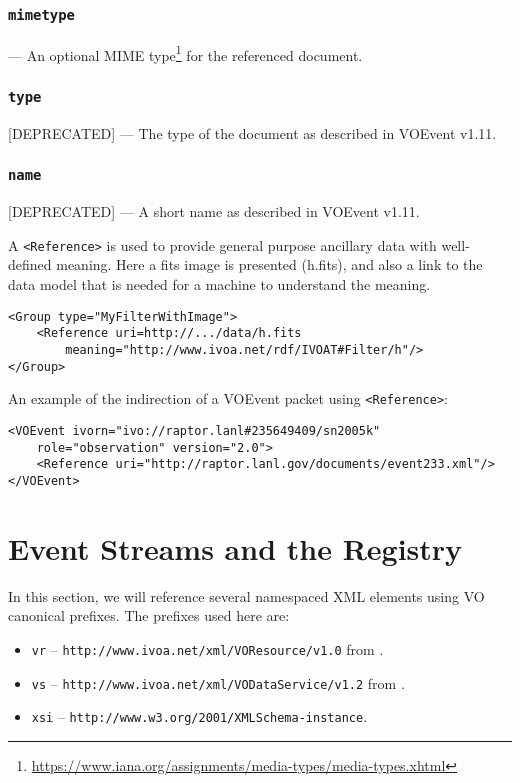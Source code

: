\documentclass[11pt,a4paper]{ivoa}
\begin{document}
\subsubsection{\tt mimetype}\label{sec:3.9.3}--- An optional MIME type\footnote{
\url{https://www.iana.org/assignments/media-types/media-types.xhtml}} for the
referenced document.
\subsubsection{\tt type}\label{sec:3.9.4}[DEPRECATED] --- The type of the
document as described in VOEvent v1.11.
\subsubsection{\tt name}\label{sec:3.9.5}[DEPRECATED] --- A short name as
described in VOEvent v1.11.

A {\tt <Reference>} is used to provide general purpose ancillary data with
well-defined meaning. Here a fits image is presented (h.fits), and also a link
to the data model that is needed for a machine to understand the meaning.
\begin{lstlisting}
<Group type="MyFilterWithImage">
    <Reference uri=http://.../data/h.fits
        meaning="http://www.ivoa.net/rdf/IVOAT#Filter/h"/>
</Group>
\end{lstlisting}
An example of the indirection of a VOEvent packet using {\tt <Reference>}:
\begin{lstlisting}
<VOEvent ivorn="ivo://raptor.lanl#235649409/sn2005k"
    role="observation" version="2.0">
    <Reference uri="http://raptor.lanl.gov/documents/event233.xml"/>
</VOEvent>
\end{lstlisting}

\section{Event Streams and the Registry}
\label{sec:registry-matters}

In this section, we will reference several namespaced XML elements using
VO canonical prefixes.  The prefixes used here are:

\begin{itemize}
\item \verb|vr| -- \nolinkurl{http://www.ivoa.net/xml/VOResource/v1.0}
from \citet{2018ivoa.spec.0625P}.
\item \verb|vs| --
\nolinkurl{http://www.ivoa.net/xml/VODataService/v1.2}
from \citet{2021ivoa.spec.1102D}.
\item \verb|xsi| --
\nolinkurl{http://www.w3.org/2001/XMLSchema-instance}.
\end{itemize}
\end{document}
